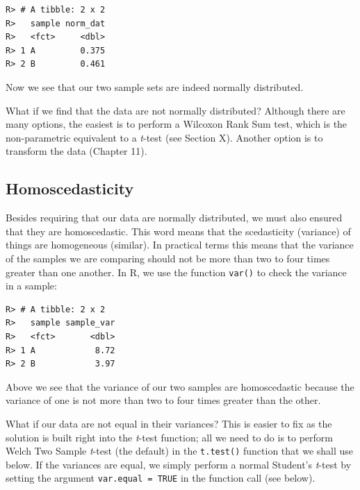 \documentclass[english,10pt,a4paper,oneside]{book}
\newenvironment{Shaded}{\begin{snugshade}}{\end{snugshade}}
\newcommand{\KeywordTok}[1]{\textcolor[rgb]{0.13,0.29,0.53}{\textbf{#1}}}
\newcommand{\DataTypeTok}[1]{\textcolor[rgb]{0.13,0.29,0.53}{#1}}
\newcommand{\StringTok}[1]{\textcolor[rgb]{0.31,0.60,0.02}{#1}}
\newcommand{\OperatorTok}[1]{\textcolor[rgb]{0.81,0.36,0.00}{\textbf{#1}}}
\newcommand{\NormalTok}[1]{#1}
\theoremstyle{definition}
\theoremstyle{definition}
\theoremstyle{definition}
\theoremstyle{remark}
\begin{document}
\begin{verbatim}
R> # A tibble: 2 x 2
R>   sample norm_dat
R>   <fct>     <dbl>
R> 1 A         0.375
R> 2 B         0.461
\end{verbatim}

Now we see that our two sample sets are indeed normally distributed.

What if we find that the data are not normally distributed? Although
there are many options, the easiest is to perform a Wilcoxon Rank Sum
test, which is the non-parametric equivalent to a \emph{t}-test (see
Section X). Another option is to transform the data (Chapter 11).

\subsection{Homoscedasticity}\label{homoscedasticity}

Besides requiring that our data are normally distributed, we must also
ensured that they are homoscedastic. This word means that the
scedasticity (variance) of things are homogeneous (similar). In
practical terms this means that the variance of the samples we are
comparing should not be more than two to four times greater than one
another. In R, we use the function \texttt{var()} to check the variance
in a sample:

\begin{Shaded}
\end{Shaded}

\begin{verbatim}
R> # A tibble: 2 x 2
R>   sample sample_var
R>   <fct>       <dbl>
R> 1 A            8.72
R> 2 B            3.97
\end{verbatim}

Above we see that the variance of our two samples are homoscedastic
because the variance of one is not more than two to four times greater
than the other.

What if our data are not equal in their variances? This is easier to fix
as the solution is built right into the \emph{t}-test function; all we
need to do is to perform Welch Two Sample \emph{t}-test (the default) in
the \texttt{t.test()} function that we shall use below. If the variances
are equal, we simply perform a normal Student's \emph{t}-test by setting
the argument \texttt{var.equal\ =\ TRUE} in the function call (see
below).
\end{document}
